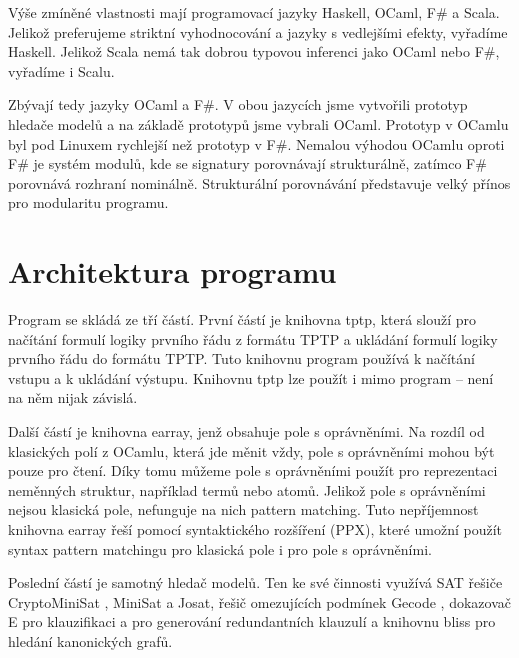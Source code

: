 Výše zmíněné vlastnosti mají programovací jazyky
Haskell, OCaml, F\# a Scala.
Jelikož preferujeme striktní vyhodnocování
a jazyky s vedlejšími efekty, vyřadíme Haskell.
Jelikož Scala nemá tak dobrou typovou inferenci
jako OCaml nebo F\#, vyřadíme i Scalu.


Zbývají tedy jazyky OCaml a F\#.
V obou jazycích jsme vytvořili prototyp
hledače modelů a na základě prototypů
jsme vybrali OCaml.
Prototyp v OCamlu byl pod Linuxem rychlejší než prototyp v F\#.
Nemalou výhodou OCamlu oproti F\# je systém modulů,
kde se signatury porovnávají strukturálně,
zatímco F\# porovnává rozhraní nominálně.
Strukturální porovnávání představuje velký přínos pro modularitu
programu.

\section{Architektura programu}

Program \crossbow{} se skládá ze tří částí.
První částí je knihovna tptp, která slouží
pro načítání formulí logiky prvního řádu
z formátu TPTP \cite{tptpformat} a ukládání formulí logiky prvního řádu
do formátu TPTP. Tuto knihovnu program \crossbow{} používá
k načítání vstupu a k ukládání výstupu.
Knihovnu tptp lze použít i mimo program \crossbow{} -- není
na něm nijak závislá.

Další částí je knihovna earray, jenž obsahuje pole s oprávněními.
Na rozdíl od klasických polí z OCamlu, která jde měnit vždy,
pole s oprávněními mohou být pouze pro čtení.
Díky tomu můžeme pole s oprávněními použít pro reprezentaci
neměnných struktur, například termů nebo atomů.
Jelikož pole s oprávněními nejsou klasická pole,
nefunguje na nich pattern matching.
Tuto nepříjemnost knihovna earray řeší pomocí
syntaktického rozšíření (PPX), které umožní použít
syntax pattern matchingu pro klasická pole
i pro pole s oprávněními.

Poslední částí je samotný hledač modelů.
Ten ke své činnosti využívá SAT řešiče CryptoMiniSat \cite{cryptominisat},
MiniSat \cite{minisat} a Josat, řešič omezujících podmínek
Gecode \cite{gecode}, dokazovač E \cite{eprover18} pro klauzifikaci a
pro generování redundantních klauzulí a knihovnu bliss \cite{bliss}
pro hledání kanonických grafů.


